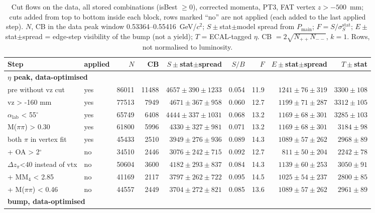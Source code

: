 \begin{table}[H]
\centering\footnotesize
\setlength{\tabcolsep}{3pt}
\caption{Cut flows on the data, all stored combinations (isBest $\geq 0$), corrected momenta, PT3, FAT vertex $z>-500$~mm; cuts added from top to bottom inside each block, rows marked ``no'' are not applied (each added to the last applied step). $N$, CB in the data peak window 0.53364--0.55416~GeV/$c^2$; $S\pm$stat$\pm$model spread from $P_\mathrm{main}$; $F=S/\sigma_S^\mathrm{stat}$; $E\pm$stat$\pm$spread = edge-step visibility of the bump (not a yield); $T$ = ECAL-tagged $\eta$. CB $=2\sqrt{N_{++}N_{--}}$, $k=1$. Rows, not normalised to luminosity.}
\label{tab:opt_cutflow}
\begin{tabular}{llrrrrrrr}
\toprule
Step & applied & $N$ & CB & $S\pm$stat$\pm$spread & $S/B$ & $F$ & $E\pm$stat$\pm$spread & $T\pm$stat \\
\midrule
\multicolumn{9}{l}{\textbf{$\eta$ peak, data-optimised}} \\
pre without vz cut & yes & 86011 & 11488 & $4657\pm390\pm1233$ & 0.054 & 11.9 & $1241\pm76\pm319$ & $3300\pm108$ \\
vz > -160 mm & yes & 77513 & 7949 & $4671\pm367\pm958$ & 0.060 & 12.7 & $1199\pm71\pm287$ & $3312\pm105$ \\
$\alpha_\mathrm{lab}$ < 55$^\circ$ & yes & 65749 & 6408 & $4444\pm337\pm1031$ & 0.068 & 13.2 & $1169\pm68\pm301$ & $3285\pm103$ \\
M($\pi\pi$) > 0.30 & yes & 61800 & 5996 & $4330\pm327\pm981$ & 0.071 & 13.2 & $1169\pm68\pm301$ & $3184\pm98$ \\
both $\pi$ in vertex fit & yes & 45433 & 2510 & $3949\pm276\pm936$ & 0.089 & 14.3 & $1089\pm57\pm262$ & $2968\pm89$ \\
+ OA > 2$^\circ$ & no & 34510 & 2446 & $3076\pm242\pm715$ & 0.092 & 12.7 & $811\pm50\pm204$ & $2242\pm78$ \\
$\Delta z_\pi$<40 instead of vtx & no & 50604 & 3600 & $4182\pm293\pm837$ & 0.084 & 14.3 & $1139\pm60\pm253$ & $3050\pm91$ \\
+ MM$_4$ < 2.85 & no & 41169 & 2117 & $3797\pm262\pm722$ & 0.095 & 14.5 & $1025\pm54\pm237$ & $2800\pm85$ \\
+ M($\pi\pi$) < 0.46 & no & 44557 & 2449 & $3704\pm272\pm821$ & 0.085 & 13.6 & $1089\pm57\pm262$ & $2961\pm89$ \\
\midrule
\multicolumn{9}{l}{\textbf{bump, data-optimised}} \\

\end{tabular}
\end{table}
